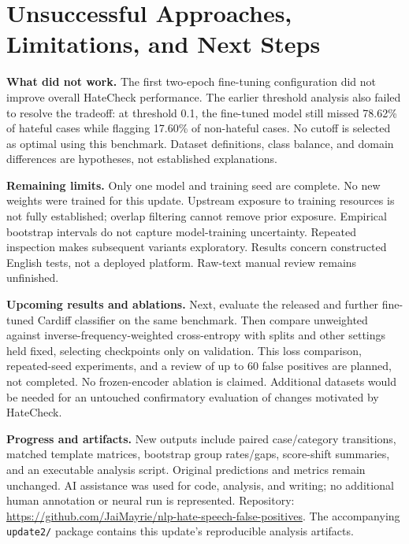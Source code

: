 \documentclass[11pt]{article}
\begin{document}
\section{Unsuccessful Approaches, Limitations, and Next Steps}
\textbf{What did not work.} The first two-epoch fine-tuning configuration did not improve overall HateCheck performance. The earlier threshold analysis also failed to resolve the tradeoff: at threshold 0.1, the fine-tuned model still missed 78.62\% of hateful cases while flagging 17.60\% of non-hateful cases. No cutoff is selected as optimal using this benchmark. Dataset definitions, class balance, and domain differences are hypotheses, not established explanations.

\textbf{Remaining limits.} Only one model and training seed are complete. No new weights were trained for this update. Upstream exposure to training resources is not fully established; overlap filtering cannot remove prior exposure. Empirical bootstrap intervals do not capture model-training uncertainty. Repeated inspection makes subsequent variants exploratory. Results concern constructed English tests, not a deployed platform. Raw-text manual review remains unfinished.

\textbf{Upcoming results and ablations.} Next, evaluate the released and further fine-tuned Cardiff classifier on the same benchmark. Then compare unweighted against inverse-frequency-weighted cross-entropy with splits and other settings held fixed, selecting checkpoints only on validation. This loss comparison, repeated-seed experiments, and a review of up to 60 false positives are planned, not completed. No frozen-encoder ablation is claimed. Additional datasets would be needed for an untouched confirmatory evaluation of changes motivated by HateCheck.

\textbf{Progress and artifacts.} New outputs include paired case/category transitions, matched template matrices, bootstrap group rates/gaps, score-shift summaries, and an executable analysis script. Original predictions and metrics remain unchanged. AI assistance was used for code, analysis, and writing; no additional human annotation or neural run is represented. Repository: \url{https://github.com/JaiMayrie/nlp-hate-speech-false-positives}. The accompanying \texttt{update2/} package contains this update's reproducible analysis artifacts.

\clearpage

\end{document}
